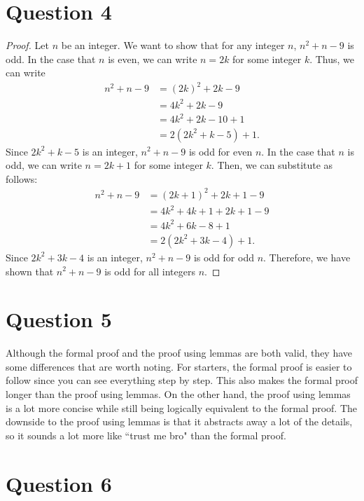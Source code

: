 \documentclass{article}
\begin{document}
\newpage
\section*{Question 4}
\begin{proof}
    Let $n$ be an integer.
    We want to show that for any integer $n$, $n^2 + n - 9$ is odd.
    In the case that $n$ is even, we can write $n = 2k$ for some integer $k$.
    Thus, we can write
    \begin{align*}
        n^2 + n - 9 &= (2k)^2 + 2k - 9 \\
        &= 4k^2 + 2k - 9 \\
        &= 4k^2 + 2k - 10 + 1 \\
        &= 2(2k^2 + k - 5) + 1.
    \end{align*}
    Since $2k^2 + k - 5$ is an integer, $n^2 + n - 9$ is odd for even $n$.
    In the case that $n$ is odd, we can write $n = 2k + 1$ for some integer $k$.
    Then, we can substitute as follows:
    \begin{align*}
        n^2 + n - 9 &= (2k + 1)^2 + 2k + 1 - 9 \\
        &= 4k^2 + 4k + 1 + 2k + 1 - 9 \\
        &= 4k^2 + 6k - 8 + 1 \\
        &= 2(2k^2 + 3k - 4) + 1.
    \end{align*}
    Since $2k^2 + 3k - 4$ is an integer, $n^2 + n - 9$ is odd for odd $n$.
    Therefore, we have shown that $n^2 + n - 9$ is odd for all integers $n$.
\end{proof}

\section*{Question 5}
Although the formal proof and the proof using lemmas are both valid, they have some differences that are worth noting.
For starters, the formal proof is easier to follow since you can see everything step by step.
This also makes the formal proof longer than the proof using lemmas.
On the other hand, the proof using lemmas is a lot more concise while still being logically equivalent to the formal proof.
The downside to the proof using lemmas is that it abstracts away a lot of the details, so it sounds a lot more like ``trust me bro" than the formal proof.

\section*{Question 6}
\end{document}
